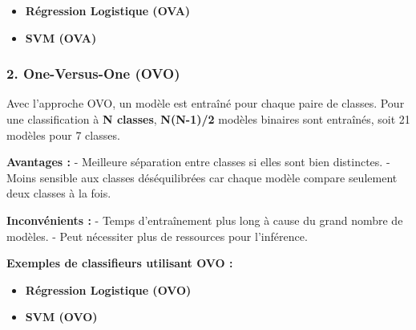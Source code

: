 \documentclass[
  letterpaper,
  DIV=11,
  numbers=noendperiod]{scrartcl}
\providecommand{\tightlist}{%
  \setlength{\itemsep}{0pt}\setlength{\parskip}{0pt}}\usepackage{longtable,booktabs,array}
\begin{document}
\begin{itemize}
\tightlist
\item
  \textbf{Régression Logistique (OVA)}
\item
  \textbf{SVM (OVA)}
\end{itemize}

\subsubsection{2. One-Versus-One (OVO)}\label{one-versus-one-ovo}

Avec l'approche OVO, un modèle est entraîné pour chaque paire de
classes. Pour une classification à \textbf{N classes}, \textbf{N(N-1)/2}
modèles binaires sont entraînés, soit 21 modèles pour 7 classes.

\textbf{Avantages :} - Meilleure séparation entre classes si elles sont
bien distinctes. - Moins sensible aux classes déséquilibrées car chaque
modèle compare seulement deux classes à la fois.

\textbf{Inconvénients :} - Temps d'entraînement plus long à cause du
grand nombre de modèles. - Peut nécessiter plus de ressources pour
l'inférence.

\textbf{Exemples de classifieurs utilisant OVO :}

\begin{itemize}
\tightlist
\item
  \textbf{Régression Logistique (OVO)}
\item
  \textbf{SVM (OVO)}
\end{itemize}
\end{document}
